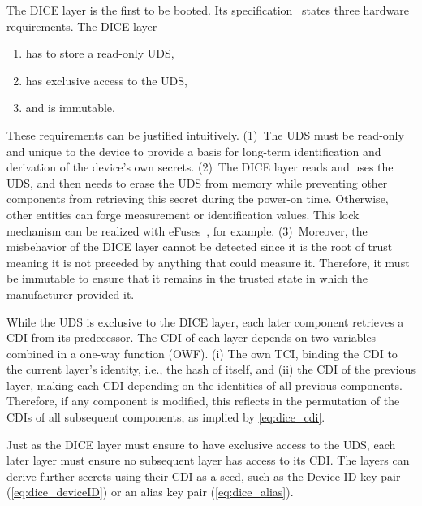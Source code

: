The DICE layer is the first to be booted.
Its specification~\cite{dice-hardware-reqs} states three hardware requirements.
The DICE layer 
\begin{enumerate}
  \item has to store a read-only \ac{UDS},
  \item has exclusive access to the \ac{UDS},
  \item and is immutable.
\end{enumerate}
These requirements can be justified intuitively.
(1)~The \ac{UDS} must be read-only and unique to the device to provide a basis for long-term identification and derivation of the device's own secrets.
(2)~The DICE layer reads and uses the \ac{UDS}, and then needs to erase the \ac{UDS} from memory while preventing other components from retrieving this secret during the power-on time.
Otherwise, other entities can forge measurement or identification values. This lock mechanism can be realized with eFuses~\cite{dice-hardware-reqs}, for example.
(3)~Moreover, the misbehavior of the DICE layer cannot be detected since it is the root of trust meaning it is not preceded by anything that could measure it.
Therefore, it must be immutable to ensure that it remains in the trusted state in which the manufacturer provided it.


While the \ac{UDS} is exclusive to the DICE layer, each later component retrieves a \ac{CDI} from its predecessor.
The \ac{CDI} of each layer depends on two variables combined in a one-way function (OWF).
(i) The own \ac{TCI}, binding the \ac{CDI} to the current layer's identity, i.e., the hash of itself, and (ii) the \ac{CDI} of the previous layer, making each \ac{CDI} depending on the identities of all previous components.
Therefore, if any component is modified, this reflects in the permutation of the \acp{CDI} of all subsequent components, as implied by \autoref{eq:dice_cdi}.


Just as the DICE layer must ensure to have exclusive access to the \ac{UDS}, each later layer must ensure no subsequent layer has access to its \ac{CDI}\@.
The layers can derive further secrets using their \ac{CDI} as a seed, such as the Device ID key pair (\autoref{eq:dice_deviceID}) or an alias key pair (\autoref{eq:dice_alias}).

